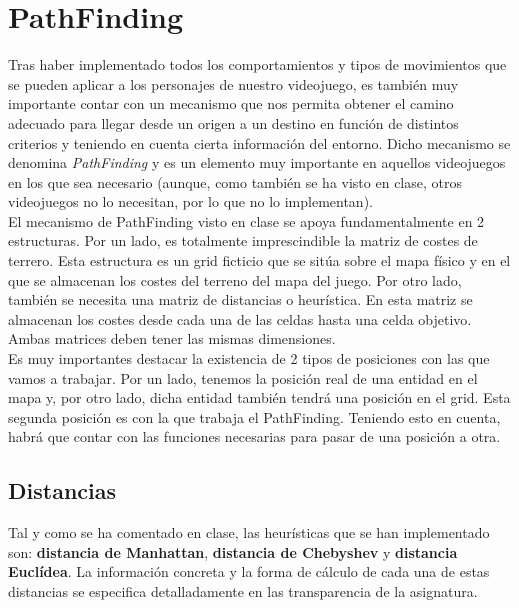 \medskip
\section{PathFinding}

Tras haber implementado todos los comportamientos y tipos de movimientos que se pueden aplicar a los personajes de nuestro videojuego, es también muy importante contar con un mecanismo que nos permita obtener el camino adecuado para llegar desde un origen a un destino en función de distintos criterios y teniendo en cuenta cierta información del entorno. Dicho mecanismo se denomina \textit{PathFinding} y es un elemento muy importante en aquellos videojuegos en los que sea necesario (aunque, como también se ha visto en clase, otros videojuegos no lo necesitan, por lo que no lo implementan). \\

El mecanismo de PathFinding visto en clase se apoya fundamentalmente en 2 estructuras. Por un lado, es totalmente imprescindible la matriz de costes de terrero. Esta estructura es un grid ficticio que se sitúa sobre el mapa físico y en el que se almacenan los costes del terreno del mapa del juego. Por otro lado, también se necesita una matriz de distancias o heurística. En esta matriz se almacenan los costes desde cada una de las celdas hasta una celda objetivo. Ambas matrices deben tener las mismas dimensiones. \\

Es muy importantes destacar la existencia de 2 tipos de posiciones con las que vamos a trabajar. Por un lado, tenemos la posición real de una entidad en el mapa y, por otro lado, dicha entidad también tendrá una posición en el grid. Esta segunda posición es con la que trabaja el PathFinding. Teniendo esto en cuenta, habrá que contar con las funciones necesarias para pasar de una posición a otra.

\subsection{Distancias}

Tal y como se ha comentado en clase, las heurísticas que se han implementado son: \textbf{distancia de Manhattan}, \textbf{distancia de Chebyshev} y \textbf{distancia Euclídea}. La información concreta y la forma de cálculo de cada una de estas distancias se especifica detalladamente en las transparencia de la asignatura. \\

